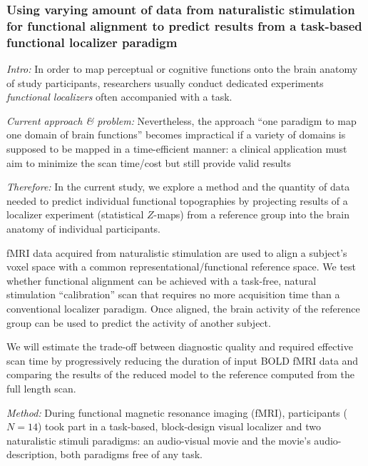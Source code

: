 \subsubsection{Using varying amount of data from naturalistic stimulation for
functional alignment to predict results from a task-based functional localizer
paradigm}



\textit{Intro:} In order to map perceptual or cognitive functions onto the brain
anatomy of study participants, researchers usually conduct dedicated experiments
\textit{functional localizers} often accompanied with a task.

\textit{Current approach \& problem:} Nevertheless, the approach ``one paradigm
to map one domain of brain functions'' becomes impractical if a variety of
domains is supposed to be mapped in a time-efficient manner:
%
a clinical application must aim to minimize the scan time/cost but still provide
valid results

\textit{Therefore:} In the current study, we explore a method and the quantity
of data needed to predict individual functional topographies by projecting
results of a localizer experiment (statistical $Z$-maps) from a reference group
into the brain anatomy of individual participants.

%
fMRI data acquired from naturalistic stimulation are used to align a subject's
voxel space with a common representational/functional reference space.
%
We test whether functional alignment can be achieved with a task-free, natural
stimulation ``calibration'' scan that requires no more acquisition time than a
conventional localizer paradigm.
%
Once aligned, the brain activity of the reference group can be used to predict
the activity of another subject.

%
We will estimate the trade-off between diagnostic quality and required effective
scan time by progressively reducing the duration of input BOLD fMRI data and
comparing the results of the reduced model to the reference computed from the
full length scan.


\textit{Method:}
During functional magnetic resonance imaging (fMRI), participants ($N=14$) took
part in a task-based, block-design visual localizer and two naturalistic stimuli
paradigms: an audio-visual movie and the movie's audio-description, both
paradigms free of any task.

